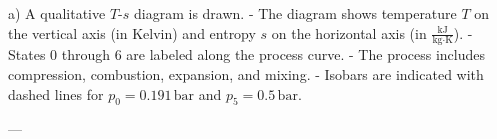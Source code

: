 a) A qualitative \( T \)-\( s \) diagram is drawn.  
- The diagram shows temperature \( T \) on the vertical axis (in Kelvin) and entropy \( s \) on the horizontal axis (in \( \frac{\text{kJ}}{\text{kg·K}} \)).  
- States 0 through 6 are labeled along the process curve.  
- The process includes compression, combustion, expansion, and mixing.  
- Isobars are indicated with dashed lines for \( p_0 = 0.191 \, \text{bar} \) and \( p_5 = 0.5 \, \text{bar} \).  

---